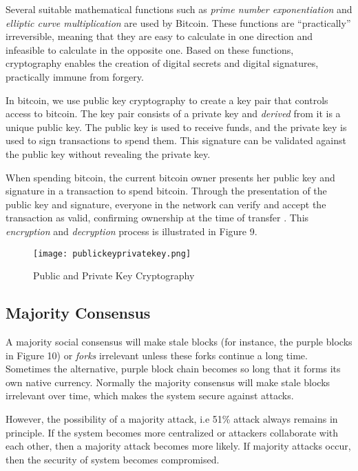 \documentclass[12pt]{article}
\newcommand{\1}{\mathbbm 1}
\begin{document}
		
		Several suitable mathematical functions such as \textit{prime number exponentiation} and \textit{elliptic curve multiplication} are used by Bitcoin. These functions are ``practically'' irreversible, meaning that they are easy to calculate in one direction and infeasible to calculate in the opposite one. Based on these functions, cryptography enables the creation of digital secrets and digital signatures, practically immune from forgery.
		
		
		In bitcoin, we use public key cryptography to create a key pair that controls access to bitcoin. The key pair consists of a private key and \textit{derived} from it is a unique public key. The public key is used to receive funds, and the private key is used to sign transactions to spend them. This signature can be validated against the public key without revealing the private key.
		
		When spending bitcoin, the current bitcoin owner presents her public key and signature in a transaction to spend bitcoin. Through the presentation of the public key and signature, everyone in the network can verify and accept the transaction as valid, confirming ownership at the time of transfer \cite{andreas2022mastering}. This \textit{encryption} and \textit{decryption} process is illustrated in Figure 9.
		
		\begin{figure}[H]
			\begin{Center}
				\texttt{[image: publickeyprivatekey.png]}		
				\caption{Public and Private Key Cryptography}
			\end{Center}
		\end{figure}
		
		
		\subsection{\textbf{Majority Consensus}}
		
		A majority social consensus will make stale blocks (for instance, the purple blocks in Figure 10) or \textit{forks} irrelevant unless these forks continue a long time. Sometimes the alternative, purple block chain becomes so long that it forms its own native currency. Normally the majority consensus will make stale blocks irrelevant over time, which makes the system secure against attacks. 
		
		However, the possibility of  a majority attack, i.e 51\% attack always remains in principle. If the system becomes more centralized or attackers collaborate with each other, then a majority attack becomes more likely. If majority attacks occur, then the security of system becomes compromised.
		
\end{document}
